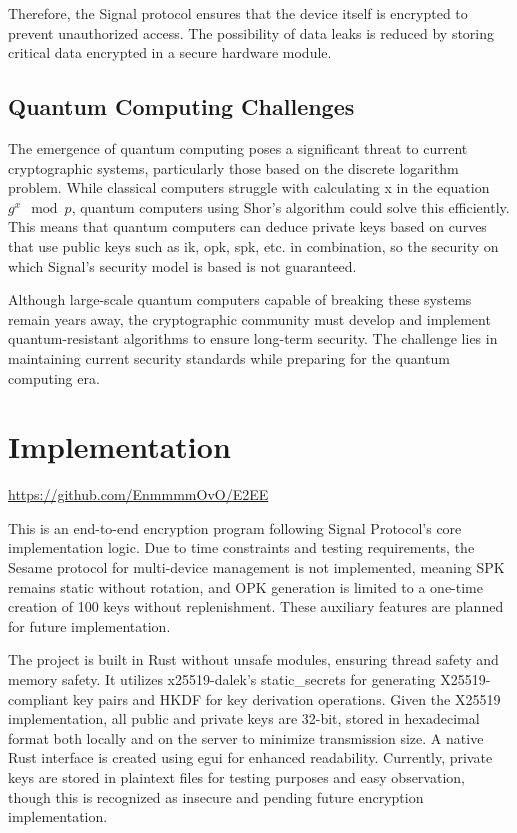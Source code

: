 \documentclass[9pt,a4paper,twoside]{rho-class/rho}
\begin{document}
Therefore, the Signal protocol ensures that the device itself is encrypted to prevent unauthorized access. The possibility of data leaks is reduced by storing critical data encrypted in a secure hardware module.

\subsection{Quantum Computing Challenges}
The emergence of quantum computing poses a significant threat to current cryptographic systems, particularly those based on the discrete logarithm problem. While classical computers struggle with calculating x in the equation $g^x \mod p$, quantum computers using Shor's algorithm could solve this efficiently. This means that quantum computers can deduce private keys based on curves that use public keys such as ik, opk, spk, etc. in combination, so the security on which Signal's security model is based is not guaranteed.

Although large-scale quantum computers capable of breaking these systems remain years away, the cryptographic community must develop and implement quantum-resistant algorithms to ensure long-term security. The challenge lies in maintaining current security standards while preparing for the quantum computing era.

\section{Implementation}
\href{https://github.com/EnmmmmOvO/E2EE}{https://github.com/EnmmmmOvO/E2EE}

This is an end-to-end encryption program following Signal Protocol's core implementation logic. Due to time constraints and testing requirements, the Sesame protocol for multi-device management is not implemented, meaning SPK remains static without rotation, and OPK generation is limited to a one-time creation of 100 keys without replenishment. These auxiliary features are planned for future implementation.

The project is built in Rust without unsafe modules, ensuring thread safety and memory safety. It utilizes x25519-dalek's static\_secrets for generating X25519-compliant key pairs and HKDF for key derivation operations. Given the X25519 implementation, all public and private keys are 32-bit, stored in hexadecimal format both locally and on the server to minimize transmission size. A native Rust interface is created using egui for enhanced readability. Currently, private keys are stored in plaintext files for testing purposes and easy observation, though this is recognized as insecure and pending future encryption implementation.

\end{document}
